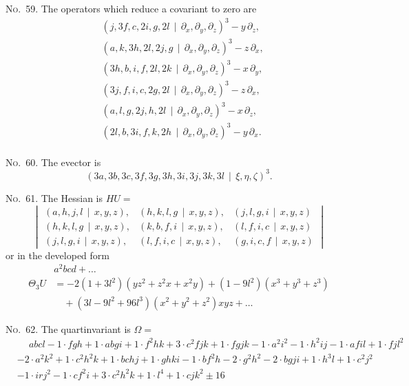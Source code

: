 \documentclass[11pt,a4paper]{article}
\begin{document}
\noindent\textsc{No.~59.} The operators which reduce a covariant to zero are
\begin{align*}
&(j, 3f, c, 2i, g, 2l \, \mid\, \partial_x, \partial_y, \partial_z)^3 - y\,\partial_z,\\
&(a, k, 3h, 2l, 2j, g \, \mid\, \partial_x, \partial_y, \partial_z)^3 - z\,\partial_x,\\
&(3h, b, i, f, 2l, 2k \, \mid\, \partial_x, \partial_y, \partial_z)^3 - x\,\partial_y,\\
&(3j, f, i, c, 2g, 2l \, \mid\, \partial_x, \partial_y, \partial_z)^3 - z\,\partial_x,\\
&(a, l, g, 2j, h, 2l \, \mid\, \partial_x, \partial_y, \partial_z)^3 - x\,\partial_z,\\
&(2l, b, 3i, f, k, 2h \, \mid\, \partial_x, \partial_y, \partial_z)^3 - y\,\partial_x.\\
\end{align*}

\noindent\textsc{No.~60.} The evector is
\[(3a, 3b, 3c, 3f, 3g, 3h, 3i, 3j, 3k, 3l \, \mid\, \xi, \eta, \zeta)^3.\]

\noindent\textsc{No.~61.} The Hessian is $HU =$
\[
\begin{vmatrix}
(a, h, j, l \, \mid\, x, y, z), & (h, k, l, g \, \mid\, x, y, z), & (j, l, g, i \, \mid\, x, y, z) \\
(h, k, l, g \, \mid\, x, y, z), & (k, b, f, i \, \mid\, x, y, z), & (l, f, i, c \, \mid\, x, y, z) \\
(j, l, g, i \, \mid\, x, y, z), & (l, f, i, c \, \mid\, x, y, z), & (g, i, c, f \, \mid\, x, y, z)
\end{vmatrix}
\]
or in the developed form
\begin{align*}
&a^2bcd + \ldots \\
\Theta_3 U &= -2(1 + 3l^2)(yz^2 + z^2x + x^2y) + (1 - 9l^2)(x^3 + y^3 + z^3)\\
&\quad + (3l - 9l^2 + 96l^3)(x^2 + y^2 + z^2)xyz + \ldots
\end{align*}

\clearpage
\noindent\textsc{No.~62.} The quartinvariant is $\Omega =$
\begin{align*}
&\phantom{+} abcl - 1\cdot fgh + 1\cdot abgi + 1\cdot f^2hk + 3\cdot c^2fjk + 1\cdot fgjk - 1\cdot a^2i^2 - 1\cdot h^2ij - 1\cdot afil + 1\cdot fjl^2\\
& - 2\cdot a^2k^2 + 1\cdot c^2h^2k + 1\cdot bchj + 1\cdot ghki - 1\cdot bf^2h - 2\cdot g^2h^2 - 2\cdot bgji + 1\cdot h^3l + 1\cdot c^2j^2\\
& - 1\cdot irj^2 - 1\cdot cf^2i + 3\cdot c^2h^2k + 1\cdot l^4 + 1\cdot cjk^2 \pm 16
\end{align*}
\end{document}
